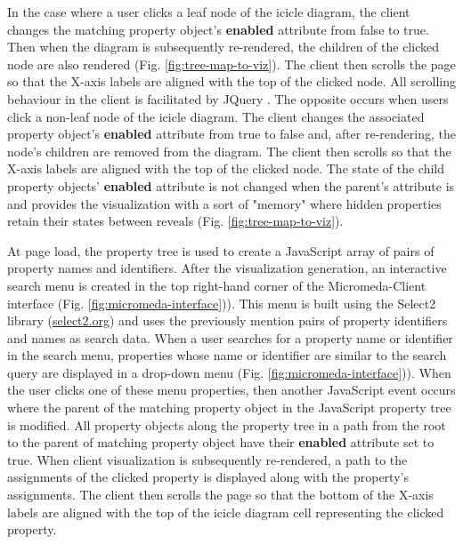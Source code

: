 In the case where a user clicks a leaf node of the icicle diagram, the client changes the matching property object's \textbf{enabled} attribute from false to true. Then when the diagram is subsequently re-rendered, the children of the clicked node are also rendered (Fig. \ref{fig:tree-map-to-viz}). The client then scrolls the page so that the X-axis labels are aligned with the top of the clicked node. All scrolling behaviour in the client is facilitated by JQuery \cite{li2012jquery}. The opposite occurs when users click a non-leaf node of the icicle diagram. The client changes the associated property object's \textbf{enabled} attribute from true to false and, after re-rendering, the node's children are removed from the diagram. The client then scrolls so that the X-axis labels are aligned with the top of the clicked node. The state of the child property objects' \textbf{enabled} attribute is not changed when the parent's attribute is and provides the visualization with a sort of "memory" where hidden properties retain their states between reveals (Fig. \ref{fig:tree-map-to-viz}).

At page load, the property tree is used to create a JavaScript array of pairs of property names and identifiers. After the visualization generation, an interactive search menu is created in the top right-hand corner of the Micromeda-Client interface (Fig. \ref{fig:micromeda-interface})). This menu is built using the Select2 library \cite{select2} (\href{select2.org}{select2.org}) and uses the previously mention pairs of property identifiers and names as search data. When a user searches for a property name or identifier in the search menu, properties whose name or identifier are similar to the search query are displayed in a drop-down menu (Fig. \ref{fig:micromeda-interface})). When the user clicks one of these menu properties, then another JavaScript event occurs where the parent of the matching property object in the JavaScript property tree is modified. All property objects along the property tree in a path from the root to the parent of matching property object have their \textbf{enabled} attribute set to true. When client visualization is subsequently re-rendered, a path to the assignments of the clicked property is displayed along with the property's assignments. The client then scrolls the page so that the bottom of the X-axis labels are aligned with the top of the icicle diagram cell representing the clicked property.

